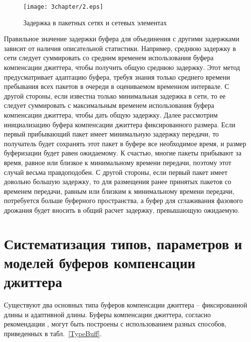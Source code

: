 \begin{figure} [h]
  \center
\texttt{[image: 3chapter/2.eps]}
  \caption{Задержка в пакетных сетях и сетевых элементах}
  \label{img3:delNode}
\end{figure}

Правильное значение задержки буфера для объединения с другими задержками зависит от наличия описательной статистики. Например, среднюю задержку в сети следует суммировать со средним временем использования буфера компенсации джиттера, чтобы получить общую среднюю задержку. Этот метод предусматривает адаптацию буфера, требуя знания только среднего времени пребывания всех пакетов в очереди в оцениваемом временном интервале. С другой стороны, если известна только минимальная задержка в сети, то ее следует суммировать с максимальным временем использования буфера компенсации джиттера, чтобы дать общую задержку.
Далее рассмотрим инициализацию буфера компенсации джиттера фиксированного размера. Если первый прибывающий пакет имеет минимальную задержку передачи, то получатель будет сохранять этот пакет в буфере все необходимое время, и размер буферизации будет равен ожидаемому. К счастью, многие пакеты прибывают за время, равное или близкое к минимальному времени передачи, поэтому этот случай весьма правдоподобен. 
С другой стороны, если первый пакет имеет довольно большую задержку, то для размещения ранее принятых пакетов со временем передачи, равным или близким к минимальному времени передачи, потребуется больше буферного пространства, а буфер для сглаживания фазового дрожания будет вносить в общий расчет задержку, превышающую ожидаемую.

\section{Систематизация типов, параметров и моделей буферов компенсации джиттера} \label{sect3_3}

Существуют два основных типа буферов компенсации джиттера – фиксированной длины и адаптивной длины. Буферы компенсации джиттера, согласно рекомендации \cite{G1020}, могут быть построены с использованием разных способов, приведенных в табл. \ref{TypeBuff}.

